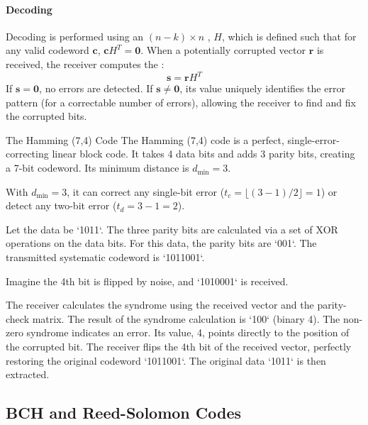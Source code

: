 \paragraph{Decoding}
Decoding is performed using an $(n-k) \times n$ , $H$, which is defined such that for any valid codeword $\mathbf{c}$, $\mathbf{c}H^T = \mathbf{0}$. When a potentially corrupted vector $\mathbf{r}$ is received, the receiver computes the :
\begin{equation}
    \mathbf{s} = \mathbf{r}H^T
\end{equation}
If $\mathbf{s} = \mathbf{0}$, no errors are detected. If $\mathbf{s} \neq \mathbf{0}$, its value uniquely identifies the error pattern (for a correctable number of errors), allowing the receiver to find and fix the corrupted bits.


\begin{workedexample}{The Hamming (7,4) Code}
     The Hamming (7,4) code is a perfect, single-error-correcting linear block code. It takes 4 data bits and adds 3 parity bits, creating a 7-bit codeword. Its minimum distance is $d_{\min}=3$.
    
     With $d_{\min}=3$, it can correct any single-bit error ($t_c = \lfloor(3-1)/2\rfloor = 1$) or detect any two-bit error ($t_d = 3-1 = 2$).

     Let the data be `1011`. The three parity bits are calculated via a set of XOR operations on the data bits. For this data, the parity bits are `001`. The transmitted systematic codeword is `1011001`.
    
     Imagine the 4th bit is flipped by noise, and `1010001` is received.
    \begin{derivationsteps}
        \step The receiver calculates the syndrome using the received vector and the parity-check matrix.
        \step The result of the syndrome calculation is `100` (binary 4).
        \step The non-zero syndrome indicates an error. Its value, 4, points directly to the position of the corrupted bit.
        \step The receiver flips the 4th bit of the received vector, perfectly restoring the original codeword `1011001`. The original data `1011` is then extracted.
    \end{derivationsteps}
\end{workedexample}


\subsection{BCH and Reed-Solomon Codes}

